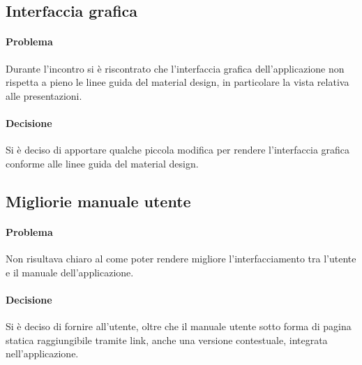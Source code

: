\subsection{Interfaccia grafica}
\paragraph{Problema} Durante l'incontro si è riscontrato che l'interfaccia grafica dell'applicazione non rispetta a pieno le linee guida del material design, in particolare la vista relativa alle presentazioni.
\paragraph{Decisione} Si è deciso di apportare qualche piccola modifica per rendere l'interfaccia grafica conforme alle linee guida del material design.
\subsection{Migliorie manuale utente}
\paragraph{Problema} Non risultava chiaro al  come poter rendere migliore l'interfacciamento tra l'utente e il manuale dell'applicazione.
\paragraph{Decisione} Si è deciso di fornire all'utente, oltre che il manuale utente sotto forma di pagina statica raggiungibile tramite link, anche una versione contestuale, integrata nell'applicazione.
